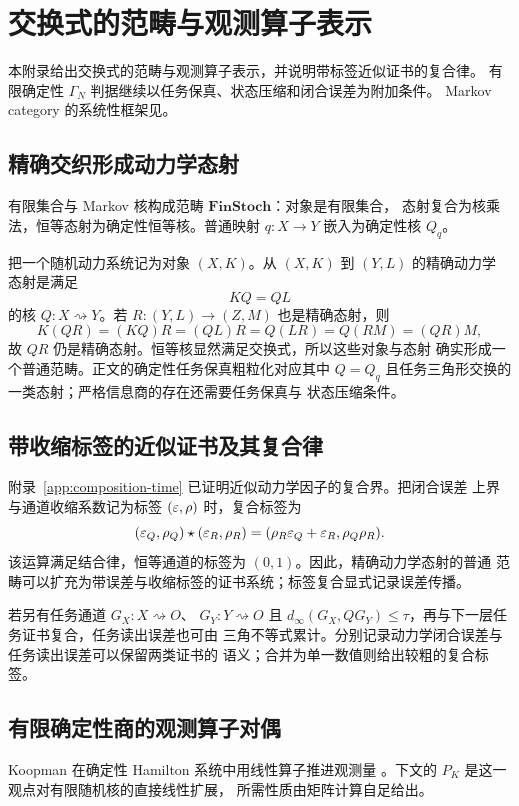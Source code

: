 \section{交换式的范畴与观测算子表示}
\label{app:categories}

本附录给出交换式的范畴与观测算子表示，并说明带标签近似证书的复合律。
有限确定性 $\Gamma_N$ 判据继续以任务保真、状态压缩和闭合误差为附加条件。
Markov category 的系统性框架见\citet{Fritz2020}。

\subsection{精确交织形成动力学态射}

有限集合与 Markov 核构成范畴 $\mathbf{FinStoch}$：对象是有限集合，
态射复合为核乘法，恒等态射为确定性恒等核。普通映射
$q:X\to Y$ 嵌入为确定性核 $Q_q$。

把一个随机动力系统记为对象 $(X,K)$。从 $(X,K)$ 到 $(Y,L)$ 的精确动力学
态射是满足
\[
KQ=QL
\]
的核 $Q:X\rightsquigarrow Y$。若
$R:(Y,L)\to(Z,M)$ 也是精确态射，则
\[
K(QR)=(KQ)R=(QL)R=Q(LR)=Q(RM)=(QR)M,
\]
故 $QR$ 仍是精确态射。恒等核显然满足交换式，所以这些对象与态射
确实形成一个普通范畴。正文的确定性任务保真粗粒化对应其中
$Q=Q_q$ 且任务三角形交换的一类态射；严格信息商的存在还需要任务保真与
状态压缩条件。

\subsection{带收缩标签的近似证书及其复合律}

附录~\ref{app:composition-time} 已证明近似动力学因子的复合界。把闭合误差
上界与通道收缩系数记为标签 $(\varepsilon,\rho)$ 时，复合标签为
\[
(\varepsilon_Q,\rho_Q)\star(\varepsilon_R,\rho_R)
=(\rho_R\varepsilon_Q+\varepsilon_R,\rho_Q\rho_R).
\]
该运算满足结合律，恒等通道的标签为 $(0,1)$。因此，精确动力学态射的普通
范畴可以扩充为带误差与收缩标签的证书系统；标签复合显式记录误差传播。

若另有任务通道 $G_X:X\rightsquigarrow O$、
$G_Y:Y\rightsquigarrow O$ 且
$d_\infty(G_X,QG_Y)\le\tau$，再与下一层任务证书复合，任务读出误差也可由
三角不等式累计。分别记录动力学闭合误差与任务读出误差可以保留两类证书的
语义；合并为单一数值则给出较粗的复合标签。

\subsection{有限确定性商的观测算子对偶}

Koopman 在确定性 Hamilton 系统中用线性算子推进观测量
\citep{Koopman1931}。下文的 $P_K$ 是这一观点对有限随机核的直接线性扩展，
所需性质由矩阵计算自足给出。


